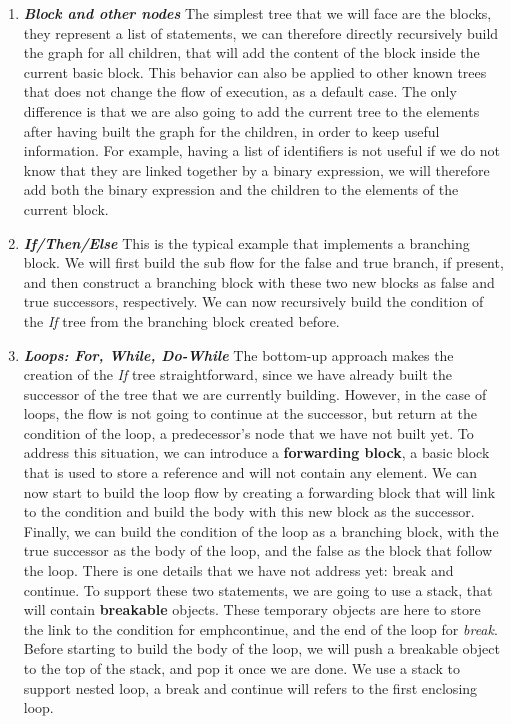 \begin{enumerate}
	\item \textbf{\textit{Block and other nodes}} \newline 
	\label{subsubsec:block_and_others}
	The simplest tree that we will face are the blocks, they represent a list of statements, we can therefore directly recursively build the graph for all children, that will add the content of the block inside the current basic block. 
	This behavior can also be applied to other known trees that does not change the flow of execution, as a default case.
	The only difference is that we are also going to add the current tree to the elements after having built the graph for the children, in order to keep useful information. 
	For example, having a list of identifiers is not useful if we do not know that they are linked together by a binary expression, we will therefore add both the binary expression and the children to the elements of the current block.
	
	\item \textbf{\textit{If/Then/Else}} \newline 
	\label{subsubsec:if_then_else}
	This is the typical example that implements a branching block. 
	We will first build the sub flow for the false and true branch, if present, and then construct a branching block with these two new blocks as false and true successors, respectively.
	We can now recursively build the condition of the \emph{If} tree from the branching block created before.
	
	\item \textbf{\textit{Loops: For, While, Do-While}} \newline 
	\label{subsubsec:loops_cfg}
	The bottom-up approach makes the creation of the \emph{If} tree straightforward, since we have already built the successor of the tree that we are currently building. 
	However, in the case of loops, the flow is not going to continue at the successor, but return at the condition of the loop, a predecessor’s node that we have not built yet. 
	To address this situation, we can introduce a \textbf{forwarding block}, a basic block that is used to store a reference and will not contain any element.
	We can now start to build the loop flow by creating a forwarding block that will link to the condition and build the body with this new block as the successor. 
	Finally, we can build the condition of the loop as a branching block, with the true successor as the body of the loop, and the false as the block that follow the loop.
	There is one details that we have not address yet: break and continue.
	To support these two statements, we are going to use a stack, that will contain \textbf{breakable} objects. 
	These temporary objects are here to store the link to the condition for emph{continue}, and the end of the loop for \emph{break}.
	Before starting to build the body of the loop, we will push a breakable object to the top of the stack, and pop it once we are done. 
	We use a stack to support nested loop, a break and continue will refers to the first enclosing loop.
	

\end{enumerate}
